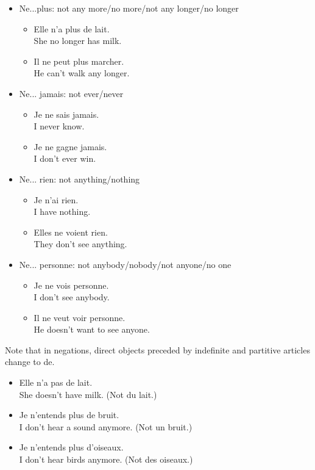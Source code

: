 \begin{itemize}
  \item  Ne...plus: not any more/no more/not any longer/no longer
    \begin{itemize}
      \item  Elle n'a plus de lait. \\ She no longer has milk.
      \item  Il ne peut plus marcher. \\ He can't walk any longer.
    \end{itemize}
  \item  Ne... jamais: not ever/never
    \begin{itemize}
      \item  Je ne sais jamais. \\ I never know.
      \item  Je ne gagne jamais. \\ I don't ever win.
    \end{itemize}
  \item  Ne... rien: not anything/nothing 
    \begin{itemize}
      \item  Je n'ai rien. \\ I have nothing.
      \item  Elles ne voient rien. \\ They don't see anything.
    \end{itemize}
  \item  Ne... personne: not anybody/nobody/not anyone/no one
    \begin{itemize}
      \item  Je ne vois personne. \\ I don't see anybody.
      \item  Il ne veut voir personne. \\ He doesn't want to see anyone.
    \end{itemize}
\end{itemize}

Note that in negations, direct objects preceded by indefinite and partitive articles change to de.

\begin{itemize}
  \item  Elle n'a pas de lait. \\ She doesn't have milk. (Not du lait.)
  \item  Je n'entends plus de bruit. \\ I don't hear a sound anymore. (Not un bruit.)
  \item  Je n'entends plus d'oiseaux. \\ I don't hear birds anymore. (Not des oiseaux.)
\end{itemize}

